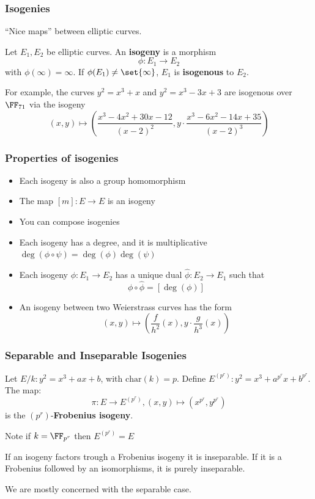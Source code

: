 \documentclass{beamer}
\begin{document}
\begin{frame}
    \frametitle{Isogenies}
    ``Nice maps'' between elliptic curves.
    
    \begin{definition}
        Let $E_1, E_2$ be elliptic curves. An \textbf{isogeny} is a morphism
        \[ \phi : E_1 \to E_2 \]
        with $\phi(\infty) = \infty$.
        If $\phi(E_1) \neq \set{\infty}$, $E_1$ is \textbf{isogenous} to $E_2$.
    \end{definition}
    
    For example, the curves $y^2 = x^3 + x$ and $y^2 = x^3 - 3x + 3$ are isogenous over $\FF_{71}$ via the isogeny 
    \[ (x, y) \mapsto \left(\frac{x^3 - 4 x^2 + 30 x -12}{(x - 2)^2}, y\cdot\frac{x^3 - 6x^2 -14x + 35}{(x - 2)^3} \right)\]
\end{frame}

\begin{frame}
    \frametitle{Properties of isogenies}

    \begin{itemize}
        \item Each isogeny is also a group homomorphism
        \item The map $[m]: E \to E$ is an isogeny
        \item You can compose isogenies
        \item Each isogeny has a degree, and it is multiplicative $\deg(\phi \circ \psi) = \deg(\phi)\deg(\psi)$
        \item Each isogeny $\phi: E_1 \to E_2$ has a unique dual $\hat{\phi}: E_2 \to E_1$ such that 
        \[ \phi \circ \hat{\phi} = [\deg(\phi)] \]
        \item An isogeny between two Weierstrass curves has the form
        \[ (x, y) \mapsto \left(\frac{f}{h^2}(x), y\cdot \frac{g}{h^3}(x) \right) \]
    \end{itemize}
\end{frame}

\begin{frame}
    \frametitle{Separable and Inseparable Isogenies}
    \begin{definition}
        Let $E/k: y^2 = x^3 + ax + b$, with $\mathrm{char}(k) = p$. Define $E^{(p^r)}: y^2 = x^3 + a^{p^r} x + b^{p^r}$.
        The map:
        \[ \pi: E \to E^{(p^r)}, (x, y) \mapsto \left(x^{p^r}, y^{p^r} \right) \]
        is the $(p^r)$-\textbf{Frobenius isogeny}. 
         
        Note if $k = \FF_{p^r}$ then $E^{(p^r)} = E$
    \end{definition}
    
    If an isogeny factors trough a Frobenius isogeny it is inseparable. 
    If it is a Frobenius followed by an isomorphisms, it is purely inseparable.
    
    We are mostly  concerned with the separable case.

\end{frame}
\end{document}
